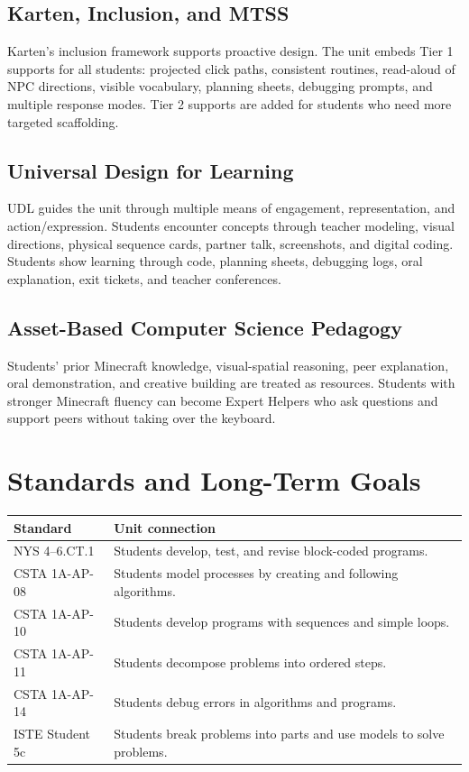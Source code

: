 \documentclass[12pt]{article}
\begin{document}
\subsection{Karten, Inclusion, and MTSS}
Karten's inclusion framework supports proactive design. The unit embeds Tier 1 supports for all students: projected click paths, consistent routines, read-aloud of NPC directions, visible vocabulary, planning sheets, debugging prompts, and multiple response modes. Tier 2 supports are added for students who need more targeted scaffolding.

\subsection{Universal Design for Learning}
UDL guides the unit through multiple means of engagement, representation, and action/expression. Students encounter concepts through teacher modeling, visual directions, physical sequence cards, partner talk, screenshots, and digital coding. Students show learning through code, planning sheets, debugging logs, oral explanation, exit tickets, and teacher conferences.

\subsection{Asset-Based Computer Science Pedagogy}
Students' prior Minecraft knowledge, visual-spatial reasoning, peer explanation, oral demonstration, and creative building are treated as resources. Students with stronger Minecraft fluency can become Expert Helpers who ask questions and support peers without taking over the keyboard.

\section{Standards and Long-Term Goals}
\begin{longtable}{@{}P{1.4in}P{5.3in}@{}}
\toprule
\textbf{Standard} & \textbf{Unit connection} \\
\midrule
NYS 4--6.CT.1 & Students develop, test, and revise block-coded programs. \\
CSTA 1A-AP-08 & Students model processes by creating and following algorithms. \\
CSTA 1A-AP-10 & Students develop programs with sequences and simple loops. \\
CSTA 1A-AP-11 & Students decompose problems into ordered steps. \\
CSTA 1A-AP-14 & Students debug errors in algorithms and programs. \\
ISTE Student 5c & Students break problems into parts and use models to solve problems. \\
\bottomrule
\end{longtable}
\end{document}

